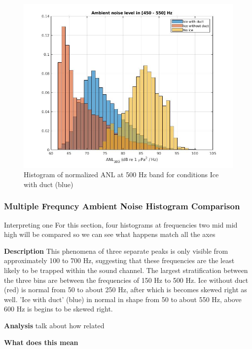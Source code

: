 \begin{figure}[H]
\centering
\includegraphics[scale=0.5]{Figures/ambient_hist_450_550.jpg}
\caption{Histogram of normalized ANL at 500 Hz band for conditions Ice with duct (blue) }
\label{fig_hist500}
\end{figure}

\subsubsection{Multiple Frequncy Ambient Noise Histogram Comparison}
Interpreting one For this section, four histograms at frequencies two mid mid high will be compared so we can see what happens
match all the axes

\textbf{Description}
This phenomena of three separate peaks is only visible from approximately 100 to 700 Hz, suggesting that these frequencies are the least likely to be trapped within the sound channel. The largest stratification between the three bins are between the frequencies of 150 Hz to 500 Hz. Ice without duct (red) is normal from 50 to about 250 Hz, after which is becomes skewed right as well. 'Ice with duct' (blue) in normal in shape from 50 to about 550 Hz, above 600 Hz is begins to be skewed right.

\textbf{Analysis}
talk about how related






\textbf{What does this mean}

